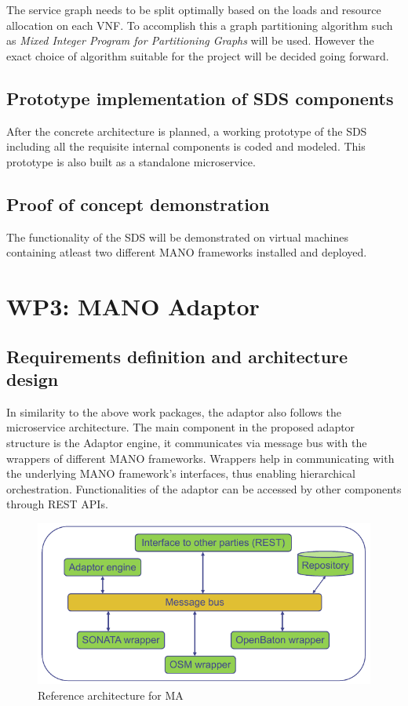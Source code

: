 The service graph needs to be split optimally based on the loads and resource allocation on each VNF. To accomplish this a graph partitioning algorithm such as \textit{Mixed Integer Program for Partitioning Graphs} \cite{MIPPG} will be used. However the exact choice of algorithm suitable for the project will be decided going forward.
\subsection{Prototype implementation of SDS components}

After the concrete architecture is planned, a working prototype of the SDS including all the requisite internal components is coded and modeled. This prototype is also built as a standalone microservice.
\subsection{Proof of concept demonstration}

The functionality of the SDS will be demonstrated on virtual machines containing atleast two different MANO frameworks installed and deployed. 

\section{WP3: MANO Adaptor}

\subsection{Requirements definition and architecture design}
In similarity to the above work packages, the adaptor also follows the microservice architecture. The main component in the proposed adaptor structure is the Adaptor engine,  it communicates via message bus with the wrappers of different MANO frameworks. Wrappers help in communicating with the underlying MANO framework's interfaces, thus enabling hierarchical orchestration. Functionalities of the adaptor can be accessed by other components through REST APIs.

\begin{figure}[h]
	\centering
	\includegraphics[width=0.9\linewidth]{figures/wp3Arch}
	\caption{Reference architecture for MA \cite{WPDescriptionsPDF}}
	\label{fig:wp3arch}
\end{figure}

